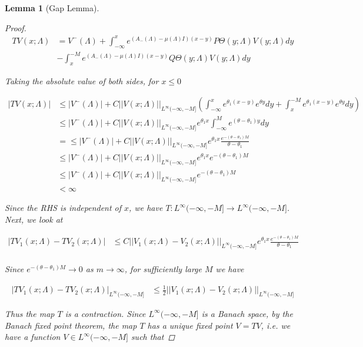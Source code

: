 \documentclass[12pt]{article}
\newtheorem{lemma}{Lemma}
\begin{document}
\begin{lemma}[Gap Lemma]
\begin{proof}
\begin{align*}
TV(x; \Lambda) &= V^-(\Lambda) 
+ \int_{-\infty}^x e^{(A_-(\Lambda) - \mu(\Lambda)I)(x-y)}P\Theta(y; \Lambda) V(y; \Lambda) dy \\
&- \int_x^{-M} e^{(A_-(\Lambda) - \mu(\Lambda)I)(x-y)}Q\Theta(y; \Lambda) V(y; \Lambda) dy
\end{align*}

Taking the absolute value of both sides, for $x \leq 0$

\begin{align*}
|TV(x; \Lambda)| &\leq |V^-(\Lambda)| + C ||V(x; \Lambda)||_{L^\infty(-\infty, -M]}
\left( \int_{-\infty}^x e^{\theta_1 (x - y)} e^{\theta y} dy + \int_x^{-M} e^{\theta_1 (x - y)} e^{\theta y} dy \right) \\
&\leq |V^-(\Lambda)| + C ||V(x; \Lambda)||_{L^\infty(-\infty, -M]} e^{\theta_1 x} \int_{-\infty}^M e^{(\theta - \theta_1) y} dy \\
&= \leq |V^-(\Lambda)| + C ||V(x; \Lambda)||_{L^\infty(-\infty, -M]} e^{\theta_1 x} \frac{e^{-(\theta - \theta_1)M}}{\theta - \theta_1}\\
&\leq |V^-(\Lambda)| + C ||V(x; \Lambda)||_{L^\infty(-\infty, -M]} e^{\theta_1 x} e^{-(\theta - \theta_1)M} \\
&\leq |V^-(\Lambda)| + C ||V(x; \Lambda)||_{L^\infty(-\infty, -M]} e^{-(\theta - \theta_1)M} \\
& < \infty
\end{align*}

Since the RHS is independent of $x$, we have $T: L^\infty(-\infty, -M] \rightarrow L^\infty(-\infty, -M]$. Next, we look at

\begin{align*}
|TV_1(x; \Lambda) - TV_2(x; \Lambda)| &\leq C ||V_1(x; \Lambda) - V_2(x; \Lambda)||_{L^\infty(-\infty, -M]} e^{\theta_1 x} \frac{e^{-(\theta - \theta_1)M}}{\theta - \theta_1}\\
\end{align*}

Since $e^{-(\theta - \theta_1)M} \rightarrow 0$ as $m \rightarrow \infty$, for sufficiently large $M$ we have 

\begin{align*}
|TV_1(x; \Lambda) - TV_2(x; \Lambda)|_{L^\infty(-\infty, -M]} &\leq \frac{1}{2} ||V_1(x; \Lambda) - V_2(x; \Lambda)||_{L^\infty(-\infty, -M]} 
\end{align*}

Thus the map $T$ is a contraction. Since $L^\infty(-\infty, -M]$ is a Banach space, by the Banach fixed point theorem, the map $T$ has a unique fixed point $V = TV$, i.e. we have a function $V \in L^\infty(-\infty, -M]$ such that 


\end{proof}
\end{lemma}
\end{document}
